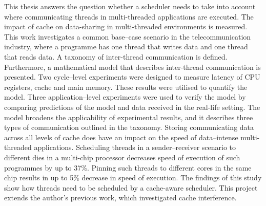 


\begin{abstracts}        %

This thesis answers the question whether a scheduler needs to take into account where communicating threads in multi-threaded applications are executed. The impact of cache on data-sharing in multi-threaded environments is measured. This work investigates a common base--case scenario in the telecommunication industry, where a programme has one thread that writes data and one thread that reads data. A taxonomy of inter-thread communication is defined. Furthermore, a mathematical model that describes inter-thread communication is presented. Two cycle--level experiments were designed to measure latency of CPU registers, cache and main memory. These results were utilised to quantify the model. Three application--level experiments were used to verify the model by comparing predictions of the model and data received in the real-life setting. The model broadens the applicability of experimental results, and it describes three types of communication outlined in the taxonomy. Storing communicating data across all levels of cache does have an impact on the speed of data--intense multi-threaded applications. Scheduling threads in a sender--receiver scenario to different dies in a multi-chip processor decreases speed of execution of such programmes by up to 37\%. Pinning such threads to different cores in the same chip results in up to 5\% decrease in speed of execution. The findings of this study show how threads need to be scheduled by a cache-aware scheduler. This project extends the author's previous work, which investigated cache interference.


\end{abstracts}
